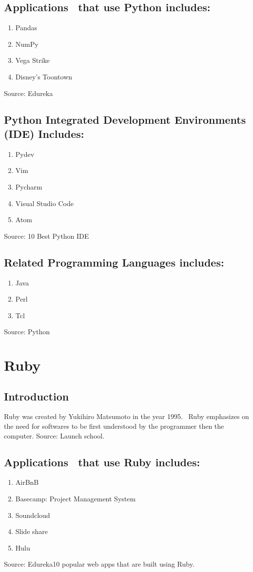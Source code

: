 \documentclass{article}
\begin{document}
\subsection{Applications  that use Python includes:}
\begin{enumerate}
	\item Pandas
	\item NumPy
	\item Vega Strike
	\item Disney's Toontown
\end{enumerate}
Source: Edureka
\subsection{Python Integrated Development Environments (IDE) Includes:}
\begin{enumerate}
	\item Pydev
	\item Vim
	\item Pycharm
	\item Visual Studio Code
	\item Atom
\end{enumerate}
Source: 10 Best Python IDE 
\subsection{Related Programming Languages includes:}
\begin{enumerate}
	\item Java
	\item Perl
	\item Tcl
\end{enumerate}
Source: Python
\section{Ruby}
\subsection{Introduction}
Ruby was created by Yukihiro Matsumoto in the year 1995.  Ruby emphasizes on the need for softwares to be first understood by the programmer then the computer.
Source: Launch school.
\subsection{Applications  that use Ruby includes:}
\begin{enumerate}
	\item AirBnB
	\item Basecamp: Project Management System
	\item Soundcloud
	\item Slide share
	\item Hulu
\end{enumerate}
Source: Edureka10 popular web apps that are built using Ruby.
\end{document}
